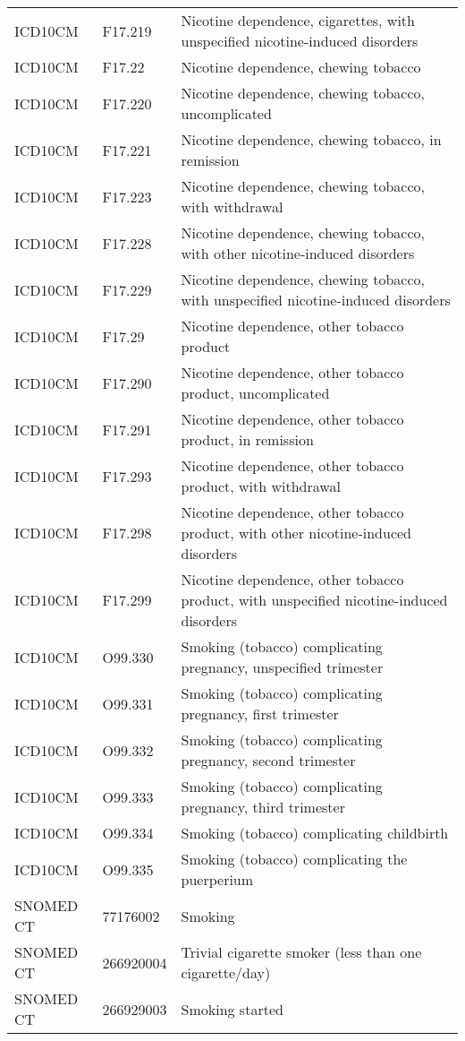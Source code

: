 \begin{longtable}{p{}p{}p{}}
  ICD10CM & F17.219 & Nicotine dependence, cigarettes, with unspecified nicotine-induced disorders \\ 
  ICD10CM & F17.22 & Nicotine dependence, chewing tobacco \\ 
  ICD10CM & F17.220 & Nicotine dependence, chewing tobacco, uncomplicated \\ 
  ICD10CM & F17.221 & Nicotine dependence, chewing tobacco, in remission \\ 
  ICD10CM & F17.223 & Nicotine dependence, chewing tobacco, with withdrawal \\ 
  ICD10CM & F17.228 & Nicotine dependence, chewing tobacco, with other nicotine-induced disorders \\ 
  ICD10CM & F17.229 & Nicotine dependence, chewing tobacco, with unspecified nicotine-induced disorders \\ 
  ICD10CM & F17.29 & Nicotine dependence, other tobacco product \\ 
  ICD10CM & F17.290 & Nicotine dependence, other tobacco product, uncomplicated \\ 
  ICD10CM & F17.291 & Nicotine dependence, other tobacco product, in remission \\ 
  ICD10CM & F17.293 & Nicotine dependence, other tobacco product, with withdrawal \\ 
  ICD10CM & F17.298 & Nicotine dependence, other tobacco product, with other nicotine-induced disorders \\ 
  ICD10CM & F17.299 & Nicotine dependence, other tobacco product, with unspecified nicotine-induced disorders \\ 
  ICD10CM & O99.330 & Smoking (tobacco) complicating pregnancy, unspecified trimester \\ 
  ICD10CM & O99.331 & Smoking (tobacco) complicating pregnancy, first trimester \\ 
  ICD10CM & O99.332 & Smoking (tobacco) complicating pregnancy, second trimester \\ 
  ICD10CM & O99.333 & Smoking (tobacco) complicating pregnancy, third trimester \\ 
  ICD10CM & O99.334 & Smoking (tobacco) complicating childbirth \\ 
  ICD10CM & O99.335 & Smoking (tobacco) complicating the puerperium \\ 
  SNOMED CT & 77176002 & Smoking \\ 
  SNOMED CT & 266920004 & Trivial cigarette smoker (less than one cigarette/day) \\ 
  SNOMED CT & 266929003 & Smoking started \\ 

\end{longtable}
